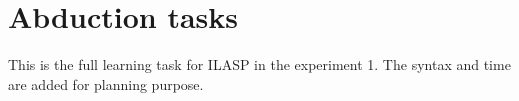 

\section{Abduction tasks}
\label{abduction}

This is the full learning task for ILASP in the experiment 1. 
The syntax and time are added for planning purpose. 







